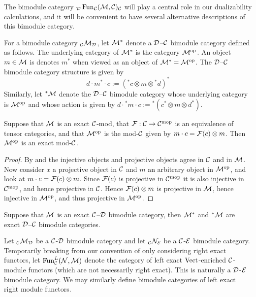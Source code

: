 \documentclass{amsart}
\begin{document}
The bimodule category ${}_\mathcal D \operatorname{Fun}_\mathcal C(\mathcal M,\mathcal C)_\mathcal C$ will play a central role in our dualizability calculations, and it will be convenient to have several alternative descriptions of this bimodule category.

\begin{definition} \label{def:Dual_bimodule_notation}
For a bimodule category ${}_\mathcal C \mathcal M_\mathcal D$, let $\mathcal M^*$ denote a $\mathcal D$--$\mathcal C$ bimodule category defined as follows.  The underlying category of $\mathcal M^*$ is the category $\mathcal M^{\mathrm{op}}$. An object $m \in \mathcal M$ is denotes $m^*$ when viewed as an object of $\mathcal M^* = \mathcal M^{\mathrm{op}}$.  The $\mathcal D$--$\mathcal C$ bimodule category structure is given by
\begin{equation*}
	d\cdot m^* \cdot c := ({}^*c \otimes m \otimes {}^*d)^*
\end{equation*}
Similarly, let ${}^*\mathcal M$ denote the $\mathcal D$--$\mathcal C$ bimodule category whose underlying category is $\mathcal M^{\mathrm{op}}$ and whose action is given by $d\cdot {}^*m \cdot c := {}^*(c^* \otimes m \otimes d^*)$.  
\end{definition}

\begin{lemma}
Suppose that $\mathcal M$ is an exact $\mathcal C$-mod, that $\mathcal F: \mathcal C \rightarrow \mathcal C^{\mathrm{mop}}$ is an equivalence of tensor categories, and that $\mathcal M^{\mathrm{op}}$ is the mod-$\mathcal C$ given by $m \cdot c = \mathcal F(c) \otimes m$.  Then $\mathcal M^{\mathrm{op}}$ is an exact mod-$\mathcal C$.
\end{lemma}
\begin{proof}
By \cite[Prop. 2.3]{MR2119143} and \cite[Corollary 3.6]{MR2119143} the injective objects and projective objects agree in $\mathcal C$ and in $\mathcal M$.  Now consider $x$ a projective object in $\mathcal C$ and $m$ an arbitrary object in $\mathcal M^{\mathrm{op}}$, and look at $m \cdot c = \mathcal F(c) \otimes m$.  Since $\mathcal F(c)$ is projective in $\mathcal C^{\mathrm{mop}}$ it is also injective in $\mathcal C^{\mathrm{mop}}$, and hence projective in $\mathcal C$.  Hence $\mathcal F(c) \otimes m$ is projective in $\mathcal M$, hence injective in $\mathcal M^{\mathrm{op}}$, and thus projective in $\mathcal M^{\mathrm{op}}$.
\end{proof}

\begin{corollary} \label{cor:adjoint-exactness}
Suppose that $\mathcal M$ is an exact $\mathcal C$--$\mathcal D$ bimodule category, then $\mathcal M^*$ and ${}^*\mathcal M$ are exact $\mathcal D$--$\mathcal C$ bimodule categories.
\end{corollary}


\begin{definition}
	Let ${}_{\mathcal C}\mathcal M_\mathcal D$ be a $\mathcal C$-$\mathcal D$ bimodule category and let ${}_{\mathcal C}\mathcal N_\mathcal E$ be a $\mathcal C$-$\mathcal E$ bimodule category. Temporarily breaking from our convention of only considering right exact functors, let	 $\operatorname{Fun}^L_{\mathcal C}(\mathcal N, \mathcal M)$ denote the category of left exact $\mathrm{Vect}$-enriched $\mathcal C$-module functors (which are not necessarily right exact). This is naturally a $\mathcal D$-$\mathcal E$ bimodule category. We may similarly define bimodule categories of left exact right module functors. 
\end{definition}
\end{document}
